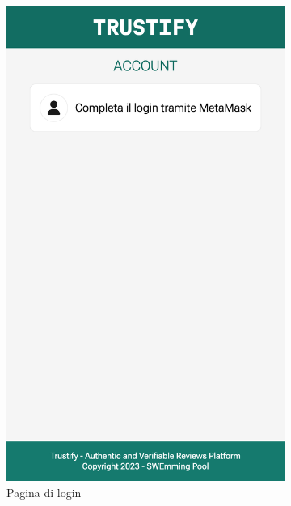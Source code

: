 \begin{figure}[t]
    \begin{subfigure}{0.33\textwidth}
    \centering
    \includegraphics[width=0.9\linewidth]{src/img/login.png}
    \caption{Pagina di login}\label{fig:login_page}
    \end{subfigure}
    \begin{subfigure}{0.33\textwidth}
    \centering

\end{subfigure}
\end{figure}
